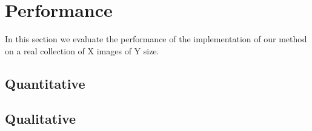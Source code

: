 \section{Performance}\label{sec:performance}

In this section we evaluate the performance of
the implementation of our method
on a real collection of X images of Y size.

\subsection{Quantitative}\label{ssec:quant}


\subsection{Qualitative}\label{ssec:qual}
